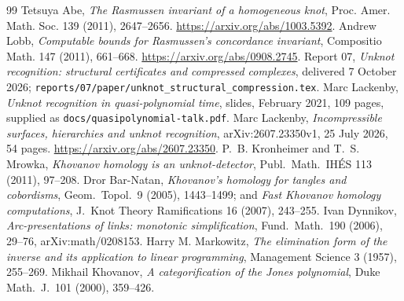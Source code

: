 \documentclass[11pt]{article}
\theoremstyle{remark}
\newcommand{\code}[1]{\texttt{#1}}
\begin{document}
\begin{thebibliography}{99}
 Tetsuya Abe, \emph{The Rasmussen invariant of a homogeneous knot}, Proc. Amer. Math. Soc. 139 (2011), 2647--2656. \url{https://arxiv.org/abs/1003.5392}.
 Andrew Lobb, \emph{Computable bounds for Rasmussen's concordance invariant}, Compositio Math. 147 (2011), 661--668. \url{https://arxiv.org/abs/0908.2745}.
 Report 07, \emph{Unknot recognition: structural certificates and compressed complexes}, delivered 7 October 2026; \code{reports/07/paper/unknot\_structural\_compression.tex}.\small
{} Marc Lackenby, \emph{Unknot recognition in quasi-polynomial time}, slides, February 2021, 109 pages, supplied as \code{docs/quasipolynomial-talk.pdf}.
 Marc Lackenby, \emph{Incompressible surfaces, hierarchies and unknot recognition}, arXiv:2607.23350v1, 25 July 2026, 54 pages. \url{https://arxiv.org/abs/2607.23350}.
 P.~B. Kronheimer and T.~S. Mrowka, \emph{Khovanov homology is an unknot-detector}, Publ.\ Math.\ IH\'ES 113 (2011), 97--208.
 Dror Bar-Natan, \emph{Khovanov's homology for tangles and cobordisms}, Geom.\ Topol.\ 9 (2005), 1443--1499; and \emph{Fast Khovanov homology computations}, J.\ Knot Theory Ramifications 16 (2007), 243--255.
 Ivan Dynnikov, \emph{Arc-presentations of links: monotonic simplification}, Fund.\ Math.\ 190 (2006), 29--76, arXiv:math/0208153.
 Harry M. Markowitz, \emph{The elimination form of the inverse and its application to linear programming}, Management Science 3 (1957), 255--269.
 Mikhail Khovanov, \emph{A categorification of the Jones polynomial}, Duke Math.\ J.\ 101 (2000), 359--426.
\end{thebibliography}

\appendix
\end{document}
